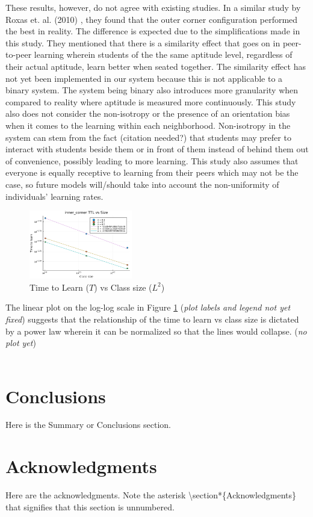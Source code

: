 \documentclass[10pt,a4paper,twoside]{article}
\begin{document}
\noindent These results, however, do not agree with existing studies. In a similar study by Roxas et. al. (2010) \cite{roxas2010seating}, they found that the outer corner configuration performed the best in reality. The difference is expected due to the simplifications made in this study. They mentioned that there is a similarity effect that goes on in peer-to-peer learning wherein students of the the same aptitude level, regardless of their actual aptitude, learn better when seated together. The similarity effect has not yet been implemented in our system because this is not applicable to a binary system. The system being binary also introduces more granularity when compared to reality where aptitude is measured more continuously. This study also does not consider the non-isotropy or the presence of an orientation bias when it comes to the learning within each neighborhood. Non-isotropy in the system can stem from the fact (citation needed?) that students may prefer to interact with students beside them or in front of them instead of behind them out of convenience, possibly leading to more learning. This study also assumes that everyone is equally receptive to learning from their peers which may not be the case, so future models will/should take into account the non-uniformity of individuals’ learning rates. 

\begin{figure}[h!]
  \centering
  \includegraphics[width=0.4\textwidth]{figures/scale_factor_preadjusted.png}
  \caption{Time to Learn ($T$) vs Class size ($L^2$)}
  \label{fig:scale factor unadjusted}
\end{figure}

\noindent The linear plot on the log-log scale in Figure \ref{fig:scale factor unadjusted} (\textit{plot labels and legend not yet fixed}) suggests that the relationship of the time to learn vs class size is dictated by a power law wherein it can be normalized so that the lines would collapse. (\textit{no plot yet})
\\
\\
\section{Conclusions}
Here is the Summary or Conclusions section.

\section*{Acknowledgments}
Here are the acknowledgments. Note the asterisk \textbackslash{\ttfamily section*}\{{\ttfamily Acknowledgments}\} that signifies that this section is unnumbered.



\end{document}
